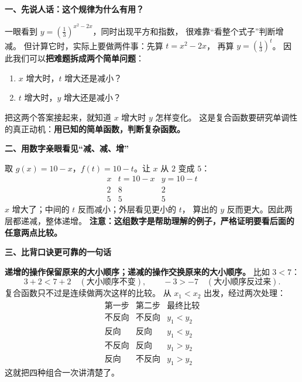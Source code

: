 \clearpage
\begin{explanationbox}
\textbf{\textcolor{CExplanation}{一、先说人话：这个规律为什么有用？}}

一眼看到 $y=\left(\frac13\right)^{x^2-2x}$，同时出现平方和指数，
很难靠“看整个式子”判断增减。
但计算它时，实际上要做两件事：先算 $t=x^2-2x$，
再算 $y=\left(\frac13\right)^t$。
因此我们可以\textbf{把难题拆成两个简单问题}：
\begin{enumerate}[leftmargin=*, itemsep=0.25em]
\item $x$ 增大时，$t$ 增大还是减小？
\item $t$ 增大时，$y$ 增大还是减小？
\end{enumerate}
把这两个答案接起来，就知道 $x$ 增大时 $y$ 怎样变化。
这是复合函数要研究单调性的真正动机：\textbf{用已知的简单函数，判断复杂函数。}

\medskip
\textbf{\textcolor{CExplanation}{二、用数字亲眼看见“减、减、增”}}

取 $g(x)=10-x$，$f(t)=10-t$。让 $x$ 从 $2$ 变成 $5$：
\[
\begin{array}{c|c|c}
 x & t=10-x & y=10-t\\ \hline
 2 & 8 & 2\\
 5 & 5 & 5
\end{array}
\]
$x$ 增大了；中间的 $t$ 反而减小；外层看见更小的 $t$，
算出的 $y$ 反而更大。因此两层都递减，整体递增。
\textbf{注意：这组数字是帮助理解的例子，严格证明要看后面的任意两点比较。}

\medskip
\textbf{\textcolor{CExplanation}{三、比背口诀更可靠的一句话}}

\textbf{递增的操作保留原来的大小顺序；递减的操作交换原来的大小顺序。}
比如 $3<7$：
\[
 3+2<7+2\quad(\text{大小顺序不变}),
 \qquad -3>-7\quad(\text{大小顺序反过来}).
\]
复合函数只不过是连续做两次这样的比较。
从 $x_1<x_2$ 出发，经过两次处理：
\[
\begin{array}{c|c|c}
 \text{第一步} & \text{第二步} & \text{最终比较}\\ \hline
 \text{不反向} & \text{不反向} & y_1<y_2\\
 \text{反向} & \text{反向} & y_1<y_2\\
 \text{不反向} & \text{反向} & y_1>y_2\\
 \text{反向} & \text{不反向} & y_1>y_2
\end{array}
\]
这就把四种组合一次讲清楚了。

\medskip
\end{explanationbox}
\clearpage
